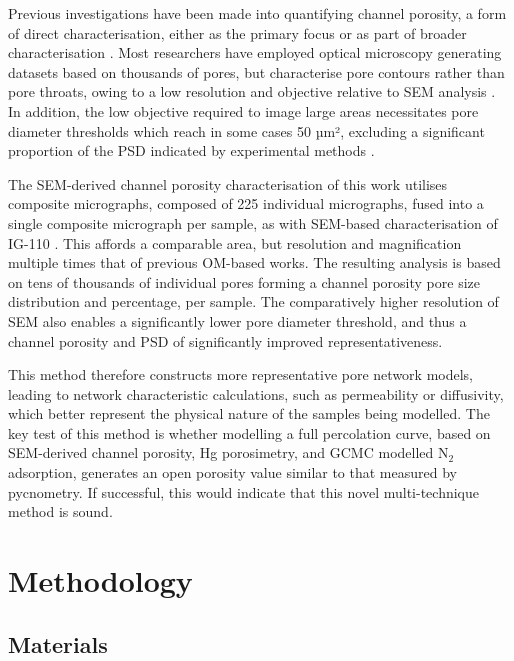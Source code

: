 \documentclass[review]{elsarticle}
\begin{document}

Previous investigations have been made into quantifying channel porosity, a form
of direct characterisation, either as the primary focus or as part of broader
characterisation \citep{Huang2014, Huang2019, Kane2011a, Kim2010,
Taylor2016,huang2021statistical, ARREGUIMENA2022112047}. Most researchers have
employed optical microscopy generating datasets based on thousands of pores, but
characterise pore contours rather than pore throats, owing to a low resolution
and objective relative to SEM analysis \citep{Huang2019, Kane2011a, Taylor2016}.
In addition, the low objective required to image large areas necessitates pore
diameter thresholds which reach in some cases 50 µm², excluding a significant
proportion of the PSD indicated by experimental methods \citep{Huang2019,
Kane2011a, Taylor2016}.

The SEM-derived channel porosity characterisation of this work utilises
composite micrographs, composed of 225 individual micrographs, fused into a
single composite micrograph per sample, as with SEM-based characterisation of
IG-110 \citep{huang2021statistical}. This affords a comparable area, but
resolution and magnification multiple times that of previous OM-based works. The
resulting analysis is based on tens of thousands of individual pores forming a
channel porosity pore size distribution and percentage, per sample. The
comparatively higher resolution of SEM also enables a significantly lower pore
diameter threshold, and thus a channel porosity and PSD of significantly
improved representativeness. 

This method therefore constructs more representative pore network models,
leading to network characteristic calculations, such as permeability or
diffusivity,  which better represent the physical nature of the samples being
modelled. The key test of this method is whether modelling a full percolation
curve, based on SEM-derived channel porosity, Hg porosimetry, and GCMC modelled
N$_2$ adsorption, generates an open porosity value similar to that measured by
pycnometry. If successful, this would indicate that this novel multi-technique
method is sound.

\section{Methodology}

\subsection{Materials}
\end{document}
